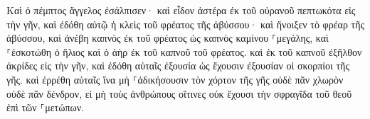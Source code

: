 \documentclass{openreader}
\begin{document}
Καὶ ὁ πέμπτος ἄγγελος ἐσάλπισεν· καὶ εἶδον ἀστέρα ἐκ τοῦ οὐρανοῦ πεπτωκότα εἰς τὴν γῆν, καὶ ἐδόθη αὐτῷ ἡ κλεὶς τοῦ φρέατος τῆς ἀβύσσου· 
καὶ ἤνοιξεν τὸ φρέαρ τῆς ἀβύσσου, καὶ ἀνέβη καπνὸς ἐκ τοῦ φρέατος ὡς καπνὸς καμίνου ⸀μεγάλης, καὶ ⸀ἐσκοτώθη ὁ ἥλιος καὶ ὁ ἀὴρ ἐκ τοῦ καπνοῦ τοῦ φρέατος. 
καὶ ἐκ τοῦ καπνοῦ ἐξῆλθον ἀκρίδες εἰς τὴν γῆν, καὶ ἐδόθη αὐταῖς ἐξουσία ὡς ἔχουσιν ἐξουσίαν οἱ σκορπίοι τῆς γῆς. 
καὶ ἐρρέθη αὐταῖς ἵνα μὴ ⸀ἀδικήσουσιν τὸν χόρτον τῆς γῆς οὐδὲ πᾶν χλωρὸν οὐδὲ πᾶν δένδρον, εἰ μὴ τοὺς ἀνθρώπους οἵτινες οὐκ ἔχουσι τὴν σφραγῖδα τοῦ θεοῦ ἐπὶ τῶν ⸀μετώπων. 
\end{document}
